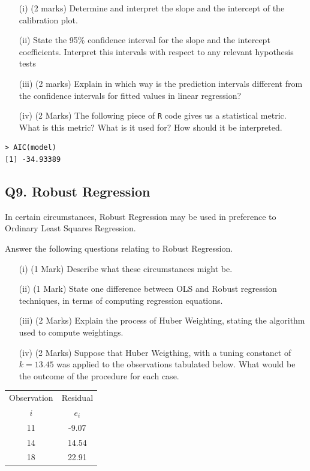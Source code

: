 \documentclass[a4paper,12pt]{article}
\begin{document}
\begin{itemize}
\item[(i)] (2 marks)
Determine and interpret the slope and the intercept of the calibration plot.
\item[(ii)] State the 95\% confidence interval for the slope and the intercept coefficients. Interpret this intervals with respect to any relevant hypothesis tests
\item[(iii)] (2 marks) Explain in which way is the prediction intervals different from the confidence intervals for fitted values in linear regression?
\item[(iv)] (2 Marks) The following piece of \texttt{R} code gives us a statistical metric. What is this metric? What is it used for? How should it be interpreted.

\end{itemize}
\begin{framed}
	\begin{verbatim}
> AIC(model)
[1] -34.93389	
\end{verbatim}
\end{framed}
\subsection*{Q9. Robust Regression}

In certain circumstances, Robust Regression may be used in preference to Ordinary Least Squares Regression. 

Answer the following questions relating to Robust Regression. 

\begin{itemize}
	\item[(i)] (1 Mark) Describe what these circumstances might be.
	\item[(ii)] (1 Mark) State one difference between OLS and Robust regression techniques, in terms of computing regression equations.
	\item[(iii)] (2 Marks) Explain the process of Huber Weighting, stating the algorithm used to compute weightings.
	\item[(iv)] (2 Marks) Suppose that Huber Weigthing, with a tuning constanct of $k=13.45$ was applied to the observations 
	tabulated below. What would be the outcome of the procedure for each case. 
\end{itemize}
\begin{center}
	\begin{tabular}{|c|c|}
		\hline
		Observation & Residual \\ 
		$i$  & $e_i$ \\ \hline
		11 & -9.07 \\ \hline 
		14 & 14.54 \\ \hline
		18 & 22.91 \\ \hline
	\end{tabular} 
\end{center}
\end{document}
